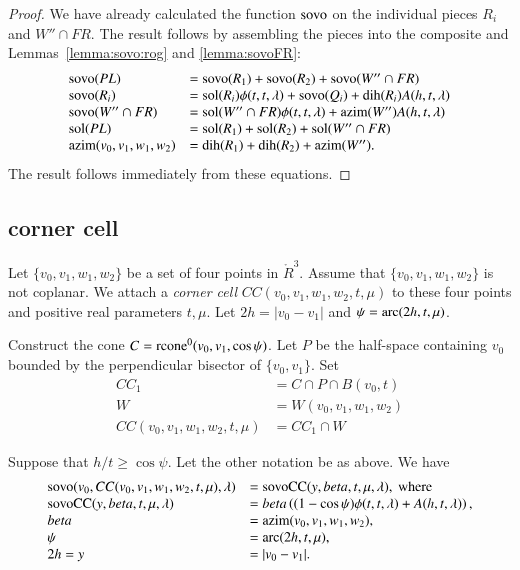 \begin{proof} We have already calculated the function ${\operatorname{sovo}}$
on the individual pieces $R_i$ and $W''\cap FR$.  The result
follows by assembling the pieces into the composite and 
Lemmas~\ref{lemma:sovo:rog} and \ref{lemma:sovoFR}:
  $$
  \begin{array}{lll}
  {\operatorname{sovo}}(PL) &= {\operatorname{sovo}}(R_1) + {\operatorname{sovo}}(R_2) + {\operatorname{sovo}}(W''\cap FR) \\
  {\operatorname{sovo}}(R_i) &= {\operatorname{sol}}(R_i) \phi(t,t,\lambda) +{\operatorname{sovo}}(Q_i)
   + \operatorname{dih}(R_i) A(h,t,\lambda)\\
  {\operatorname{sovo}}(W''\cap FR) &= {\operatorname{sol}}(W''\cap FR)\phi(t,t,\lambda) +
   {\operatorname{azim}}(W'') A(h,t,\lambda)\\
  \operatorname{sol}(PL) &=\operatorname{sol}(R_1)+\operatorname{sol}(R_2)+\operatorname{sol}(W''\cap FR)\\
  {\operatorname{azim}}(v_0,v_1,w_1,w_2) &= \operatorname{dih}(R_1)+\operatorname{dih}(R_2)+{\operatorname{azim}}(W'').
  \end{array}
  $$
The result follows immediately from these equations.
\end{proof}



\subsection{corner cell}

Let $\{v_0,v_1,w_1,w_2\}$ be a set of four points in $\ring{R}^3$.  
Assume that $\{v_0,v_1,w_1,w_2\}$ is not coplanar.
We
attach a {\it corner cell} $CC(v_0,v_1,w_1,w_2,t,\mu)$
to these four points and positive
real parameters $t,\mu$.  Let $2h=|v_0-v_1|$
and $\psi=\operatorname{arc}(2h,t,\mu)$.

Construct the cone $C={\operatorname{rcone}}^0(v_0,v_1,\cos\psi)$.
Let $P$ be the half-space containing $v_0$ bounded by
the perpendicular bisector of  $\{v_0,v_1\}$.  Set
$$
  \begin{array}{lll}
  CC_1 &= C\cap P \cap B(v_0,t)\\
  W &=W(v_0,v_1,w_1,w_2) \\
  CC(v_0,v_1,w_1,w_2,t,\mu) &= CC_1 \cap W
  \end{array}
$$

\begin{lemma} 
Suppose that $h/t \ge \cos\psi$.  Let the other notation
be as above.   We have
  $$
  \begin{array}{lll}
  {\operatorname{sovo}}(v_0,CC(v_0,v_1,w_1,w_2,t,\mu),\lambda)&=
  {\operatorname{sovoCC}}(y,beta,t,\mu,\lambda), \text{ where } \\
  {\operatorname{sovoCC}}(y,beta,t,\mu,\lambda) &= 
         beta \left((1-\cos\psi)\phi(t,t,\lambda)+
    A(h,t,\lambda)\right),\\
    beta &= {\operatorname{azim}}(v_0,v_1,w_1,w_2),\\
    \psi &= \operatorname{arc}(2h,t,\mu),\\
     2h=y &= |v_0-v_1|.
  \end{array}
  $$
\end{lemma}

